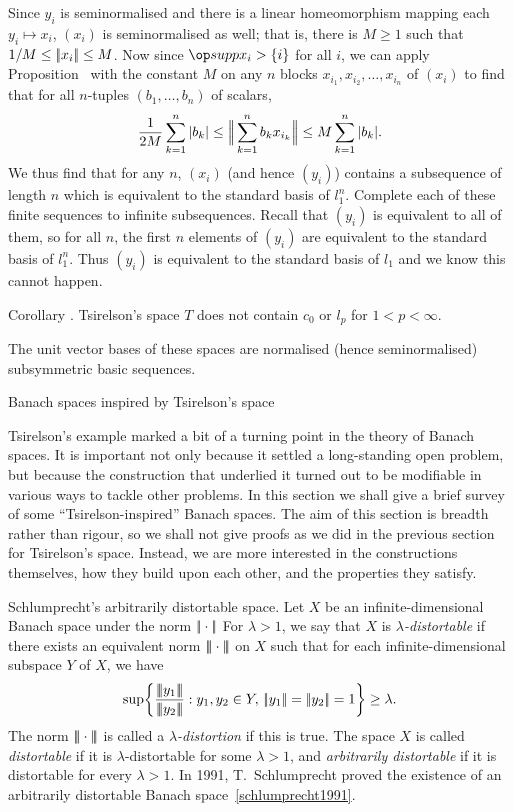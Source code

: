 Since $y_i$ is seminormalised and there is a linear homeomorphism mapping each $y_i\mapsto x_i$,
$(x_i)$ is seminormalised as well; that is, there is
$M\ge 1$ such that $1/M \le |\!|x_i|\!|\le M$.
Now since $\supp x_i > \{i\}$ for all $i$,
we can apply Proposition~{\the\tsirelsonblock} with the constant $M$ on any $n$ blocks
$x_{i_1}, x_{i_2}, \ldots, x_{i_n}$ of $(x_i)$
to find that for all $n$-tuples $(b_1,\ldots, b_n)$ of scalars,
$${1\over 2M}\sum_{k=1}^n |b_k| \le \Big|\!\Big|\sum_{k=1}^n b_kx_{i_k}\Big|\!\Big| \le M\sum_{k=1}^n |b_k|.$$
We thus find that for any $n$, $(x_i)$ (and hence $(y_i)$)
contains a subsequence of length $n$ which is equivalent to the standard basis of $l_1^n$. Complete
each of these finite sequences to infinite subsequences. Recall that $(y_i)$ is equivalent to all of them,
so for all $n$, the first $n$ elements of $(y_i)$ are equivalent to the standard basis of $l_1^n$. Thus
$(y_i)$ is equivalent to the standard basis of $l_1$ and we know this cannot happen.\slug

\proclaim Corollary \advthm. Tsirelson's space $T$ does not contain $c_0$ or $l_p$ for $1<p<\infty$.

\proof The unit vector bases of these spaces are normalised (hence seminormalised) subsymmetric
basic sequences.\slug

\advsect Banach spaces inspired by Tsirelson's space

Tsirelson's example marked a bit of a turning point in the theory of Banach spaces. It is important not
only because it settled a long-standing open problem, but because the construction that underlied it turned
out to be modifiable in various ways to tackle other problems. In this section we shall give a brief survey
of some ``Tsirelson-inspired'' Banach spaces. The aim of this section is breadth rather than rigour,
so we shall not give proofs as we did in the previous section for Tsirelson's space. Instead, we are
more interested in the constructions themselves, how they build upon each other, and the properties
they satisfy.

\medskip\boldlabel Schlumprecht's arbitrarily distortable space. Let $X$ be an infinite-dimen\-sional Banach
space under the norm $|\!|\cdot|\!|$
For $\lambda > 1$, we say that $X$ is {\it $\lambda$-distortable} if there exists an equivalent norm
$|\!|\!|\cdot|\!|\!|$ on $X$ such that for each infinite-dimensional subspace $Y$ of $X$, we have
$$\sup\biggl\{{\threenorm{y_1}\over\threenorm{y_2}}:y_1,y_2\in Y,\,\norm{y_1} = \norm{y_2} = 1\biggr\}\ge\lambda.$$
The norm $|\!|\!|\cdot|\!|\!|$ is called a {\it $\lambda$-distortion} if this is true.
The space $X$ is called {\it distortable} if it is $\lambda$-distortable for some $\lambda>1$, and
{\it arbitrarily distortable} if it is distortable for every $\lambda>1$. In 1991, T.~Schlumprecht
proved the existence of an arbitrarily distortable Banach space~\ref{schlumprecht1991}.


